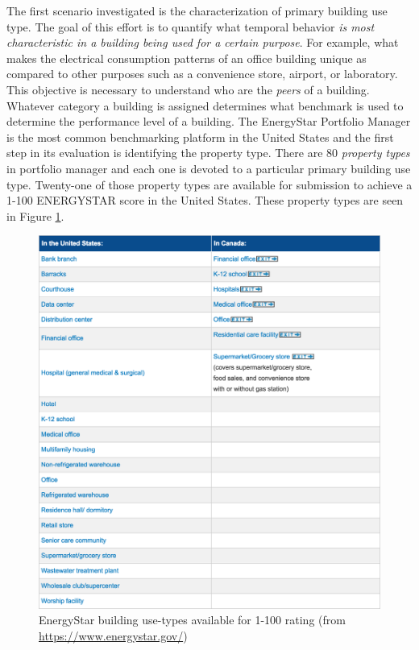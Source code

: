 The first scenario investigated is the characterization of primary building use type. The goal of this effort is to quantify what temporal behavior \emph{is most characteristic in a building being used for a certain purpose}. For example, what makes the electrical consumption patterns of an office building unique as compared to other purposes such as a convenience store, airport, or laboratory. This objective is necessary to understand who are the \emph{peers} of a building. Whatever category a building is assigned determines what benchmark is used to determine the performance level of a building. The EnergyStar Portfolio Manager is the most common benchmarking platform in the United States and the first step in its evaluation is identifying the property type. There are 80 \emph{property types} in portfolio manager and each one is devoted to a particular primary building use type. Twenty-one of those property types are available for submission to achieve a 1-100 ENERGYSTAR score in the United States. These property types are seen in Figure \ref{fig:energystarbuildings}.

\begin{figure}[ht!]
\begin{center}
\includegraphics[width=0.7\columnwidth]{figures/enegystar_buildingtypes/enegystar_buildingtypes}
\caption{{EnergyStar building use-types available for 1-100 rating (from \url{https://www.energystar.gov/})
\label{fig:energystarbuildings}%
}}
\end{center}
\end{figure}

